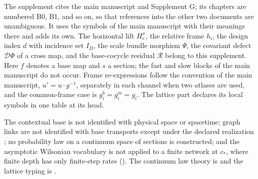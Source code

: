 The supplement cites the main manuscript and Supplement G; its chapters are numbered B0, B1, and so
on, so that references into the other two documents are unambiguous. It uses the symbols of the main
manuscript with their meanings there and adds its own. The horizontal lift \(H^x_e\), the relative frame
\(h_i\), the design index \(d\) with incidence set \(I_D\), the scale bundle morphism \(\Psi\), the
covariant defect \(\mathcal D\Phi\) of a cross map, and the base-cocycle residual \(\mathcal R\) belong
to this supplement. Here \(f\) denotes a base map and \(s\) a section; the fast and slow blocks of the
main manuscript do not occur. Frame re-expressions follow the convention of the main manuscript,
\(u'=u\cdot g^{-1}\), separately in each channel when two atlases are used, and the common-frame case is
\(g_i^b=g_i^m=g_i\). The lattice part declares its local symbols in one table at its head.

The contextual base is not identified with physical space or spacetime; graph links are not identified
with base transports except under the declared realization ; no
probability law on a continuum space of sections is constructed; and the asymptotic Wilsonian vocabulary
is not applied to a finite network at \(c_*\), where finite depth has only finite-step rates
().  The continuum law theory is  and the lattice typing
is .
